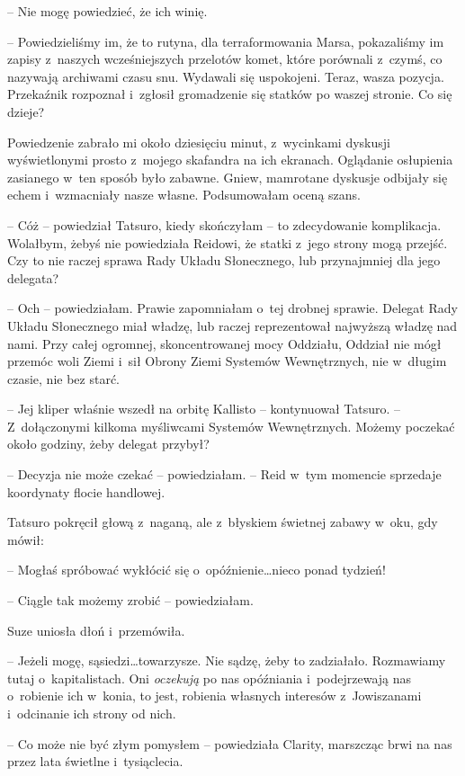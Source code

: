 \documentclass[oneside,polish,11pt,sfheadings]{mwbk}
\begin{document}
-- Nie mogę powiedzieć, że ich winię.

-- Powiedzieliśmy im, że to rutyna, dla terraformowania Marsa,
pokazaliśmy im zapisy z~naszych wcześniejszych przelotów komet, które
porównali z~czymś, co nazywają archiwami czasu snu. Wydawali się
uspokojeni. Teraz, wasza pozycja. Przekaźnik rozpoznał i~zgłosił
gromadzenie się statków po waszej stronie. Co się dzieje?

Powiedzenie zabrało mi około dziesięciu minut, z~wycinkami dyskusji
wyświetlonymi prosto z~mojego skafandra na ich ekranach. Oglądanie
osłupienia zasianego w~ten sposób było zabawne. Gniew, mamrotane
dyskusje odbijały się echem i~wzmacniały nasze własne. Podsumowałam
oceną szans.

-- Cóż -- powiedział Tatsuro, kiedy skończyłam -- to zdecydowanie
komplikacja. Wolałbym, żebyś nie powiedziała Reidowi, że statki z~jego
strony mogą przejść. Czy to nie raczej sprawa Rady Układu Słonecznego,
lub przynajmniej dla jego delegata?

-- Och -- powiedziałam. Prawie zapomniałam o~tej drobnej sprawie. Delegat
Rady Układu Słonecznego miał władzę, lub raczej reprezentował najwyższą
władzę nad nami. Przy całej ogromnej, skoncentrowanej mocy Oddziału,
Oddział nie mógł przemóc woli Ziemi i~sił Obrony Ziemi Systemów
Wewnętrznych, nie w~długim czasie, nie bez starć.

-- Jej kliper właśnie wszedł na orbitę Kallisto -- kontynuował Tatsuro. -- Z~dołączonymi kilkoma myśliwcami Systemów Wewnętrznych. Możemy poczekać
około godziny, żeby delegat przybył?

-- Decyzja nie może czekać -- powiedziałam. -- Reid w~tym momencie
sprzedaje koordynaty flocie handlowej.

Tatsuro pokręcił głową z~naganą, ale z~błyskiem świetnej zabawy w~oku,
gdy mówił: 

-- Mogłaś spróbować wykłócić się o~opóźnienie\ldots  nieco ponad
tydzień!

-- Ciągle tak możemy zrobić -- powiedziałam.

Suze uniosła dłoń i~przemówiła. 

-- Jeżeli mogę, sąsiedzi\ldots  towarzysze.
Nie sądzę, żeby to zadziałało. Rozmawiamy tutaj o~kapitalistach. Oni
\textit{oczekują} po nas opóźniania i~podejrzewają nas o~robienie ich w~konia, to jest, robienia własnych interesów z~Jowiszanami i~odcinanie
ich strony od nich.

-- Co może nie być złym pomysłem -- powiedziała Clarity, marszcząc brwi
na nas przez lata świetlne i~tysiąclecia.
\end{document}
